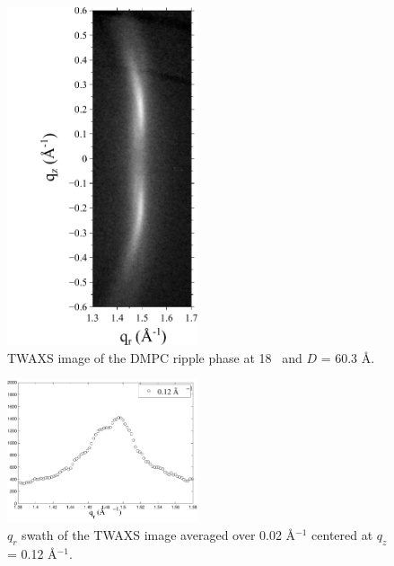 \begin{figure}
  \centering
  \includegraphics[trim=20 0 10 0,clip,width=0.5\textwidth]{figures/ripple/TWAXS/twaxs_ripple}
  \caption[TWAXS image of the DMPC ripple phase]{TWAXS image of the DMPC
  ripple phase at 18 \textcelsius\ and $D$ = 60.3 \AA.}
  \label{fig:twaxs_ripple}
\end{figure}

\begin{figure}
  \centering
  \includegraphics[width=0.5\textwidth]{figures/ripple/TWAXS/twaxs_qrplot8}
  \caption{$q_r$ swath of the TWAXS image averaged over 0.02 \AA$^{-1}$
  centered at $q_z$ = 0.12 \AA$^{-1}$.}
  \label{fig:twaxs_weak_peak}
\end{figure}


